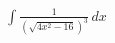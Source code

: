 \documentclass[preview]{standalone}
\begin{document}
\begin{align*}
\int \frac{1}{(\sqrt{4x^2-16})^3} \, dx
\end{align*}
\end{document}
